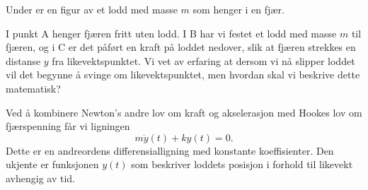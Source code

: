 \documentclass{article}
\theoremstyle{definition}
\theoremstyle{remark}
\newenvironment{ex}
{\pushQED{\qed}\renewcommand{\qedsymbol}{$\triangle$}\exx}
{\popQED\endexx}
\newcommand{\springfig}[6]{%
\begin{scope}[xshift=#6,
              spring/.style = {decorate,
                              decoration = {aspect         = 0.5, 
                                            segment length = #1,
                                            amplitude      = 2mm,
                                            coil}}]

\path (0,0)                            coordinate (g) 
      (0,-0.5cm)                       coordinate (topspring) 
      (0, #2)                          coordinate (bottomspring) 
      (bottomspring) ++(0,-.3cm)       coordinate (pt2)
                      +(0cm,-#3)       coordinate (pt3)
                      +(1.25cm,-#3)    coordinate (#5 pt3);

  \node [platform,
        anchor = south] at (g)  {};
  \draw [very thick]    (-0.5,0)         -- (0.5,0);
  \draw                (topspring)     -- (g)
                      (bottomspring)  -- (pt2.north);
  \draw [spring]       (bottomspring)  -- (topspring);
  \draw [fill=black] (pt3) circle (#3) 
                          node[inner sep = 0,
                                scale     = #4,
                                text      = white]{$m$};
  \node[below=1.5*#3] at (pt3) {#5};
  \end{scope}
}
\begin{document}
\begin{multicols*}{2}
\begin{ex} \label{ex:fjær}
  Under er en figur av et lodd med masse $m$ som henger i en fjær.
  \begin{center}
  \end{center}
  I punkt A henger fjæren fritt uten lodd. I B har vi festet et lodd med masse $m$ til fjæren, og i C er det påført en kraft på loddet nedover, slik at fjæren strekkes en distanse $y$ fra likevektspunktet. Vi vet av erfaring at dersom vi nå slipper loddet vil det begynne å svinge om likevektspunktet, men hvordan skal vi beskrive dette matematisk?
  
  Ved å kombinere Newton's andre lov om kraft og akselerasjon med Hookes lov om fjærspenning får vi ligningen
  \begin{equation*}
    m \ddot{y}(t) + k y(t) = 0.
  \end{equation*}
  Dette er en andreordens differensialligning med konstante koeffisienter. Den ukjente er funksjonen $y(t)$ som beskriver loddets posisjon i forhold til likevekt avhengig av tid.
\end{ex}


\end{multicols*}
\end{document}
